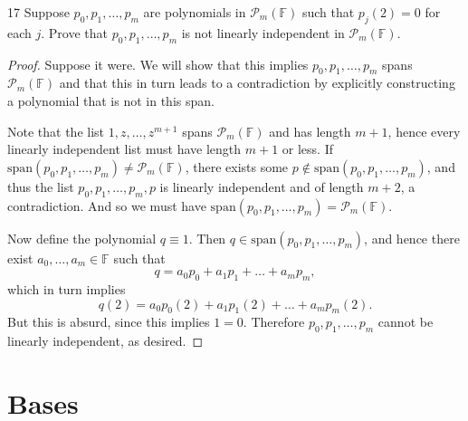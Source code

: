 \documentclass[11pt]{extarticle}
\newenvironment{problem}[1]{\begin{prob*}{#1}{}}{\end{prob*}}
\newcommand{\F}{\mathbb{F}}
\newcommand{\Span}{\mathrm{span}}
\begin{document}
\begin{problem}{17}
Suppose $p_0, p_1,\dots, p_m$ are polynomials in $\mathcal{P}_m(\F)$ such that $p_j(2)=0$ for each $j$.  Prove that $p_0,p_1,\dots,p_m$ is not linearly independent in $\mathcal{P}_m(\F)$.
\end{problem}
\begin{proof}
Suppose it were.  We will show that this implies $p_0, p_1,\dots, p_m$ spans $\mathcal{P}_m(\F)$ and that this in turn leads to a contradiction by explicitly constructing a polynomial that is not in this span.
\par Note that the list $1,z,\dots, z^{m+1}$ spans $\mathcal{P}_m(\F)$ and has length $m+1$, hence every linearly independent list must have length $m+1$ or less.  If $\Span(p_0, p_1,\dots, p_m)\neq \mathcal{P}_m(\F)$, there exists some $p\not\in\Span(p_0,p_1,\dots, p_m)$, and thus the list $p_0,p_1, \dots,p_m, p$ is linearly independent and of length $m+2$, a contradiction.  And so we must have $\Span(p_0,p_1,\dots,p_m) = \mathcal{P}_m(\F)$.
\par Now define the polynomial $q\equiv 1$.  Then $q\in\Span(p_0, p_1,\dots, p_m)$, and hence there exist $a_0,\dots, a_m\in\F$ such that 
\begin{equation*}
q = a_0p_0+a_1p_1 + \dots + a_mp_m,
\end{equation*}
which in turn implies 
\begin{equation*}
q(2) = a_0p_0(2)+a_1p_1(2) + \dots + a_mp_m(2).
\end{equation*}
But this is absurd, since this implies $1 = 0$.  Therefore $p_0,p_1,\dots,p_m$ cannot be linearly independent, as desired.
\end{proof}


\section{Bases}
\end{document}
